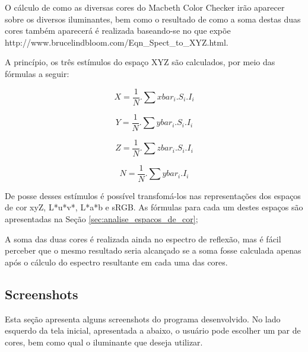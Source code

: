 \documentclass[a4paper,10pt]{report}
\begin{document}
\par
O cálculo de como as diversas cores do Macbeth Color Checker irão
aparecer sobre os diversos iluminantes, bem como o resultado de como a soma
destas duas cores também aparecerá é realizada baseando-se no que expõe
{http://www.brucelindbloom.com/Eqn_Spect_to_XYZ.html}.

\par
A princípio, os três estímulos do espaço XYZ são calculados, por meio das
fórmulas a seguir:

\begin{equation}\label{eq:XYZfromSpectrum_X}
X=\frac{1}{N}.\sum{xbar_i.S_i.I_i}
\end{equation}

\begin{equation}\label{eq:XYZfromSpectrum_Y}
Y=\frac{1}{N}.\sum{ybar_i.S_i.I_i}
\end{equation}

\begin{equation}\label{eq:XYZfromSpectrum_Z}
Z=\frac{1}{N}.\sum{zbar_i.S_i.I_i}
\end{equation}

\begin{equation}\label{eq:XYZfromSpectrum_N}
N=\frac{1}{N}.\sum{ybar_i.I_i}
\end{equation}

\par
De posse desses estímulos é possível transfomá-los nas representações dos
espaços de cor xyZ, L*u*v*, L*a*b e sRGB. As fórmulas para cada um destes
espaços são apresentadas na Seção \ref{sec:analise_espacos_de_cor};

\par
A soma das duas cores é realizada ainda no espectro de reflexão, mas é fácil
perceber que o mesmo resultado seria alcançado se a soma fosse calculada apenas
após o cálculo do espectro resultante em cada uma das cores.

\subsection{Screenshots}
\par
Esta seção apresenta alguns screenshots do programa desenvolvido. No lado
esquerdo da tela inicial, apresentada a abaixo, o usuário pode escolher um par
de cores, bem como qual o iluminante que deseja utilizar.
\end{document}
